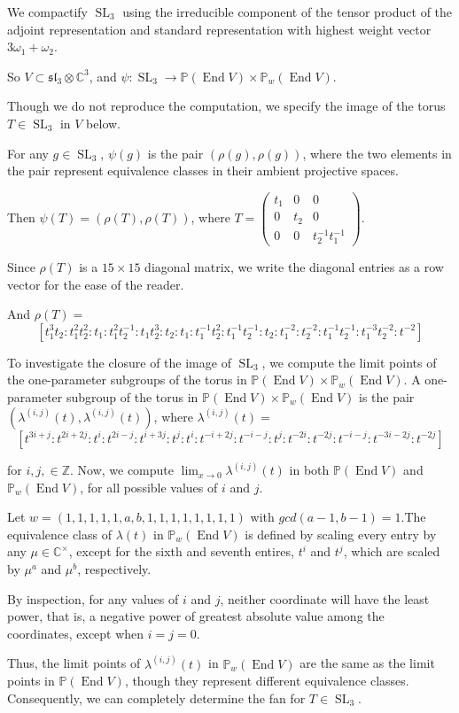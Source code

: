 \documentclass{amsart}
\newcommand{\Z}{\mathbb{Z}}
\newcommand{\C}{\mathbb{C}}
\newcommand{\Proj}{\mathbb{P}}
\DeclareMathOperator{\End}{End}
\DeclareMathOperator{\SL}{SL}
\theoremstyle{definition}
\theoremstyle{remark}
\numberwithin{equation}{section}
\begin{document}
\begin{exmp}
We compactify $\SL_3$ using the irreducible component of the tensor product of the adjoint representation and standard representation with highest weight vector $3\omega_1 + \omega_2$. 

So $V \subset \mathfrak{sl_3} \otimes \C^3$, and $\psi: \SL_3 \to \Proj(\End V) \times \Proj_w(\End V)$. 

Though we do not reproduce the computation, we specify the image of the torus $T \in \SL_3$ in $V$ below. 

For any $g \in \SL_3$, $\psi(g)$ is the pair $\left(\rho(g), \rho(g)\right)$, where the two elements in the pair represent equivalence classes in their ambient projective spaces. 

Then $\psi(T) = \left(\rho(T),\rho(T)\right)$, where $T =  \left(\begin{array}{ccc} t_1 &0&0\\0&t_2&0\\0&0&t_2^{-1}t_1^{-1} \end{array}\right)$. 

Since $\rho(T)$ is a $15 \times 15$ diagonal matrix, we write the diagonal entries as a row vector for the ease of the reader. 

And $\rho(T) =$
\[ \left[t_1^3t_2:t_1^2t_2^2:t_1:t_1^2t_2^{-1}:t_1t_2^3:t_2:t_1:t_1^{-1}t_2^2:t_1^{-1}t_2^{-1}:t_2:t_1^{-2}:t_2^{-2}:t_1^{-1}t_2^{-1}:t_1^{-3}t_2^{-2}:t^{-2}\right] \] 
 
To investigate the closure of the image of $\SL_3$, we compute the limit points of the one-parameter subgroups of the torus in $\Proj(\End V) \times \Proj_w(\End V)$. A one-parameter subgroup of the torus in $\Proj(\End V) \times \Proj_w(\End V)$ is the pair $\left(\lambda^{(i,j)}(t), \lambda^{(i,j)}(t)\right)$, where $\lambda^{(i,j)}(t)  =$ 
\[\left[t^{3i+j}:t^{2i+2j}:t^{i}:t^{2i-j}:t^{i+3j}:t^{j}:t^{i}:t^{-i+2j}:t^{-i-j}:t^j:t^{-2i}:t^{-2j}:t^{-i-j}:t^{-3i-2j}:t^{-2j}\right]\]

for $i,j, \in \Z$. Now, we compute $\lim_{x \to 0} \lambda^{(i,j)}(t)$  in both $\Proj(\End V)$ and $\Proj_w(\End V)$, for all possible values of $i$ and $j$. 

Let $w = (1,1,1,1,1,a,b,1,1,1,1,1,1,1,1)$ with $gcd(a-1,b-1) = 1$.The equivalence class of $\lambda(t)$ in $\Proj_w(\End V)$ is defined by scaling every entry by any $\mu \in \C^{\times}$, except for the sixth and seventh entires, $t^i$ and $t^j$, which are scaled by $\mu^a$ and $\mu^b$, respectively. 

By inspection, for any values of $i$ and $j$, neither coordinate will have the least power, that is, a negative power of greatest absolute value among the coordinates, except when $i=j=0$. 

Thus, the limit points of $\lambda^{(i,j)}(t)$ in $\Proj_w(\End V)$ are the same as the limit points in $\Proj(\End V)$, though they represent different equivalence classes. Consequently, we can completely determine the fan for $T \in \SL_3$.
\end{exmp}
\end{document}
